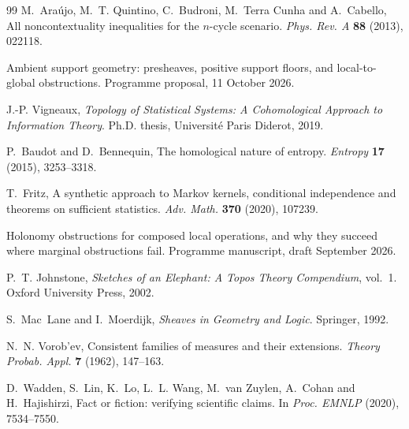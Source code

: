 \documentclass[11pt]{article}
\theoremstyle{definition}
\theoremstyle{remark}
\begin{document}
\begin{thebibliography}{99}
M.~Ara\'ujo, M.~T. Quintino, C.~Budroni, M.~Terra Cunha and A.~Cabello, All noncontextuality inequalities for the $n$-cycle scenario. \emph{Phys. Rev. A} \textbf{88} (2013), 022118.

Ambient support geometry: presheaves, positive support floors, and local-to-global obstructions. Programme proposal, 11 October 2026.

J.-P. Vigneaux, \emph{Topology of Statistical Systems: A Cohomological Approach to Information Theory}. Ph.D. thesis, Universit\'e Paris Diderot, 2019.

P.~Baudot and D.~Bennequin, The homological nature of entropy. \emph{Entropy} \textbf{17} (2015), 3253--3318.

T.~Fritz, A synthetic approach to Markov kernels, conditional independence and theorems on sufficient statistics. \emph{Adv. Math.} \textbf{370} (2020), 107239.

Holonomy obstructions for composed local operations, and why they succeed where marginal obstructions fail. Programme manuscript, draft September 2026.

P.~T. Johnstone, \emph{Sketches of an Elephant: A Topos Theory Compendium}, vol.~1. Oxford University Press, 2002.

S.~Mac~Lane and I.~Moerdijk, \emph{Sheaves in Geometry and Logic}. Springer, 1992.

N.~N. Vorob'ev, Consistent families of measures and their extensions. \emph{Theory Probab. Appl.} \textbf{7} (1962), 147--163.

D.~Wadden, S.~Lin, K.~Lo, L.~L. Wang, M.~van Zuylen, A.~Cohan and H.~Hajishirzi, Fact or fiction: verifying scientific claims. In \emph{Proc. EMNLP} (2020), 7534--7550.

\end{thebibliography}
\end{document}
